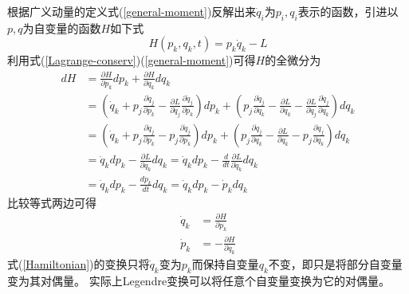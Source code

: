 \documentclass[12pt]{article}
\numberwithin{equation}{section}
\begin{document}
        根据广义动量的定义式(\ref{general-moment})反解出来$\dot{q}_i$为$p_i,q_i$表示的函数，引进以$p,q$为自变量的函数$H$如下式
        \begin{equation}\label{Hamiltonian}
            H(p_k,q_k,t)=p_k\dot{q}_k-L
        \end{equation}
        利用式(\ref{Lagrange-conserv})(\ref{general-moment})可得$H$的全微分为
        \begin{equation*}
           \begin{aligned}
               dH&=\frac{\partial H}{\partial p_k}dp_k+\frac{\partial H}{\partial q_k}dq_k\\
               &=\left( \dot{q}_k+p_j\frac{\partial \dot{q}_j}{\partial p_k}-\frac{\partial L}{\partial \dot{q}_j}\frac{\partial \dot{q}_j}{\partial p_k} \right)dp_k
               +\left( p_j\frac{\partial \dot{q}_j}{\partial q_k}-\frac{\partial L}{\partial q_k}-\frac{\partial L}{\partial \dot{q}_j}\frac{\partial \dot{q}_j}{\partial q_k}\right)dq_k\\
               &=\left( \dot{q}_k+p_j\frac{\partial \dot{q}_j}{\partial p_k}-p_j\frac{\partial \dot{q}_j}{\partial p_k} \right)dp_k
               +\left( p_j\frac{\partial \dot{q}_j}{\partial q_k}-\frac{\partial L}{\partial q_k}-p_j\frac{\partial \dot{q}_j}{\partial q_k}\right)dq_k\\
               &=\dot{q}_kdp_k-\frac{\partial L}{\partial q_k}dq_k=\dot{q}_kdp_k-\frac{d}{dt}\frac{\partial L}{\partial \dot{q}_k}dq_k\\
               &=\dot{q}_kdp_k-\frac{dp_k}{dt}dq_k=\dot{q}_kdp_k-\dot{p}_kdq_k
           \end{aligned}
        \end{equation*}
        比较等式两边可得
        \begin{equation}\label{Hamilton-canonical}
            \begin{aligned}
                \dot{q}_k&=\frac{\partial H}{\partial p_k}\\
                \dot{p}_k&=-\frac{\partial H}{\partial q_k}
            \end{aligned}
        \end{equation}
        式(\ref{Hamiltonian})的变换只将$\dot{q}_k$变为$p_k$而保持自变量$q_k$不变，即只是将部分自变量变为其对偶量。
        实际上Legendre变换可以将任意个自变量变换为它的对偶量。

        
        
    
\end{document}
